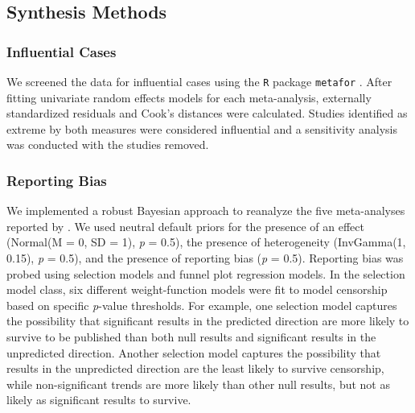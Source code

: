 \documentclass[man,floatsintext,letterpaper,12pt]{apa7}
\begin{document}
\subsection{Synthesis Methods}

\subsubsection{Influential Cases}

We screened the data for influential cases using the \texttt{R} package \texttt{metafor} \autocite{viechtbauer2010a}. After fitting univariate random effects models for each meta-analysis, externally standardized residuals and Cook's distances were calculated. Studies identified as extreme by both measures were considered influential and a sensitivity analysis was conducted with the studies removed.\footnotemark{}

\subsubsection{Reporting Bias}

We implemented a robust Bayesian approach \autocite{bartos2023} to reanalyze the five meta-analyses reported by \textcite{chua2021}. We used neutral default priors for the presence of an effect (Normal(M = 0, SD = 1), \emph{p} = 0.5), the presence of heterogeneity (InvGamma(1, 0.15), \emph{p} = 0.5), and the presence of reporting bias (\emph{p} = 0.5). Reporting bias was probed using selection models and funnel plot regression models. In the selection model class, six different weight-function models were fit to model censorship based on specific \emph{p}-value thresholds. For example, one selection model captures the possibility that significant results in the predicted direction are more likely to survive to be published than both null results and significant results in the unpredicted direction. Another selection model captures the possibility that results in the unpredicted direction are the least likely to survive censorship, while non-significant trends are more likely than other null results, but not as likely as significant results to survive.
\end{document}
